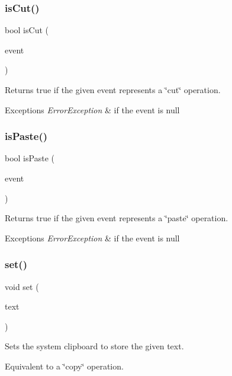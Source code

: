 \subsubsection{\texorpdfstring{is\+Cut()}{isCut()}}
{\footnotesize\ttfamily bool is\+Cut (\begin{DoxyParamCaption}\item[{Q\+Key\+Event $\ast$}]{event }\end{DoxyParamCaption})\hspace{0.3cm}{\ttfamily [static]}}



Returns true if the given event represents a \char`\"{}cut\char`\"{} operation. 


\begin{DoxyExceptions}{Exceptions}
{\em Error\+Exception} & if the event is null \\
\hline
\end{DoxyExceptions}
\mbox{\label{classGClipboard_a26e3ab35c80c96117dd4bb455cf38c82}} 
\subsubsection{\texorpdfstring{is\+Paste()}{isPaste()}}
{\footnotesize\ttfamily bool is\+Paste (\begin{DoxyParamCaption}\item[{Q\+Key\+Event $\ast$}]{event }\end{DoxyParamCaption})\hspace{0.3cm}{\ttfamily [static]}}



Returns true if the given event represents a \char`\"{}paste\char`\"{} operation. 


\begin{DoxyExceptions}{Exceptions}
{\em Error\+Exception} & if the event is null \\
\hline
\end{DoxyExceptions}
\mbox{\label{classGClipboard_a59ad3e94e40e8ef08c8a69a3a67377df}} 
\subsubsection{\texorpdfstring{set()}{set()}}
{\footnotesize\ttfamily void set (\begin{DoxyParamCaption}\item[{const std\+::string \&}]{text }\end{DoxyParamCaption})\hspace{0.3cm}{\ttfamily [static]}}



Sets the system clipboard to store the given text. 

Equivalent to a \char`\"{}copy\char`\"{} operation. 